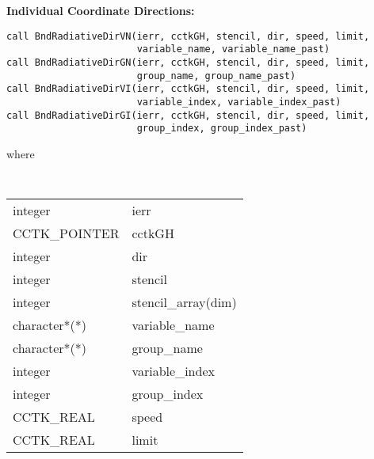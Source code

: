 \documentclass{article}
\begin{document}
\noindent
{\bf Individual Coordinate Directions:}
\begin{verbatim}
call BndRadiativeDirVN(ierr, cctkGH, stencil, dir, speed, limit, 
                       variable_name, variable_name_past)
call BndRadiativeDirGN(ierr, cctkGH, stencil, dir, speed, limit, 
                       group_name, group_name_past)
call BndRadiativeDirVI(ierr, cctkGH, stencil, dir, speed, limit, 
                       variable_index, variable_index_past)
call BndRadiativeDirGI(ierr, cctkGH, stencil, dir, speed, limit, 
                       group_index, group_index_past)
\end{verbatim}
where

{\tt
\begin{tabular}{ll}
integer & ierr \\
CCTK\_POINTER & cctkGH\\
integer & dir\\
integer & stencil\\
integer & stencil\_array(dim)\\
character*(*) & variable\_name\\
character*(*) & group\_name\\
integer & variable\_index\\
integer & group\_index\\
CCTK\_REAL&speed\\
CCTK\_REAL&limit\\
\end{tabular}
}
\end{document}
